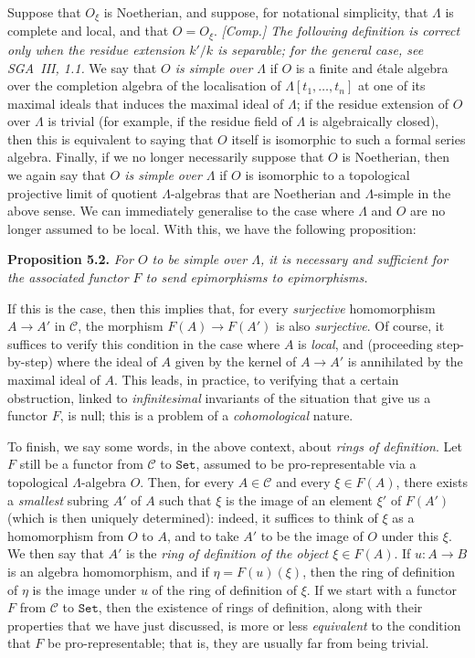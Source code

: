 \documentclass{article}
\newenvironment{itenv}[1]
  {\phantomsection\par\medskip\noindent\textbf{#1.}\itshape}
  {\medskip}
\renewcommand{\cal}[1]{{\mathcal{#1}}}
\newcommand{\Set}{\mathtt{Set}}
\newcommand{\oldpage}[1]{\marginpar{\footnotesize$\Big\vert$ \textit{p.~#1}}}
\begin{document}
Suppose that $O_\xi$ is Noetherian, and suppose, for notational simplicity, that $\Lambda$ is complete and local, and that $O=O_\xi$.
\emph{[Comp.] The following definition is correct only when the residue extension $k'/k$ is \emph{separable}; for the general case, see SGA~III, 1.1.}
We say that \emph{$O$ is simple over $\Lambda$} if $O$ is a finite and \'{e}tale algebra over the completion algebra of the localisation of $\Lambda[t_1,\ldots,t_n]$ at one of its maximal ideals that induces the maximal ideal of $\Lambda$;
if the residue extension of $O$ over $\Lambda$ is trivial (for example, if the residue field of $\Lambda$ is algebraically closed), then this is equivalent to saying that $O$ itself is isomorphic to such a formal series algebra.
Finally, if we no longer necessarily suppose that $O$ is Noetherian, then we again say that \emph{$O$ is simple over $\Lambda$} if $O$ is isomorphic to a topological projective limit of quotient $\Lambda$-algebras that are Noetherian and $\Lambda$-simple in the above sense.
We can immediately generalise to the case where $\Lambda$ and $O$ are no longer assumed to be local.
With this, we have the following proposition:

\begin{itenv}{Proposition 5.2}
\label{A.5-proposition2}
  For $O$ to be simple over $\Lambda$, it is necessary and sufficient for the associated functor $F$ to send epimorphisms to epimorphisms.
\end{itenv}

If this is the case, then this implies that, for every \emph{surjective} homomorphism $A\to A'$ in $\cal{C}$, the morphism $F(A)\to F(A')$ is also \emph{surjective}.
Of course, it suffices to verify this condition in the case where $A$ is \emph{local}, and (proceeding step-by-step) where the ideal of $A$ given by the kernel of $A\to A'$ is annihilated by the maximal ideal of $A$.
This leads, in practice, to verifying that a certain obstruction, linked to \emph{infinitesimal} invariants
\oldpage{195-09}
of the situation that give us a functor $F$, is null;
this is a problem of a \emph{cohomological} nature.

To finish, we say some words, in the above context, about \emph{rings of definition}.
Let $F$ still be a functor from $\cal{C}$ to $\Set$, assumed to be pro-representable via a topological $\Lambda$-algebra $O$.
Then, for every $A\in\cal{C}$ and every $\xi\in F(A)$, there exists a \emph{smallest} subring $A'$ of $A$ such that $\xi$ is the image of an element $\xi'$ of $F(A')$ (which is then uniquely determined):
indeed, it suffices to think of $\xi$ as a homomorphism from $O$ to $A$, and to take $A'$ to be the image of $O$ under this $\xi$.
We then say that $A'$ is the \emph{ring of definition of the object $\xi\in F(A)$}.
If $u\colon A\to B$ is an algebra homomorphism, and if $\eta=F(u)(\xi)$, then the ring of definition of $\eta$ is the image under $u$ of the ring of definition of $\xi$.
If we start with a functor $F$ from $\cal{C}$ to $\Set$, then the existence of rings of definition, along with their properties that we have just discussed, is more or less \emph{equivalent} to the condition that $F$ be pro-representable;
that is, they are usually far from being trivial.
\end{document}

